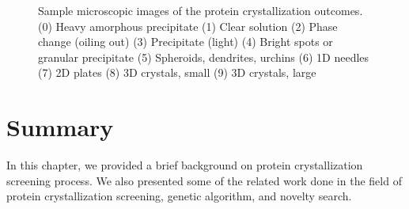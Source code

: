 \newpage
\begin{figure}[H]
	\caption{Sample microscopic images of the protein crystallization outcomes. (0) 	Heavy amorphous precipitate (1) Clear solution (2) Phase change (oiling out) (3) 	 Precipitate (light) (4) Bright spots or granular precipitate (5) Spheroids, 		dendrites, urchins 
	(6) 1D needles (7) 2D plates (8) 3D crystals, small (9) 3D crystals, large}
	\label{fig:sample-scoreImage}
\end{figure}



\section{Summary} \label{rel:summary}

In this chapter, we provided a brief background on protein crystallization screening process. 
We also presented some of the related work done in the field of protein crystallization screening, genetic algorithm, and novelty search. %


